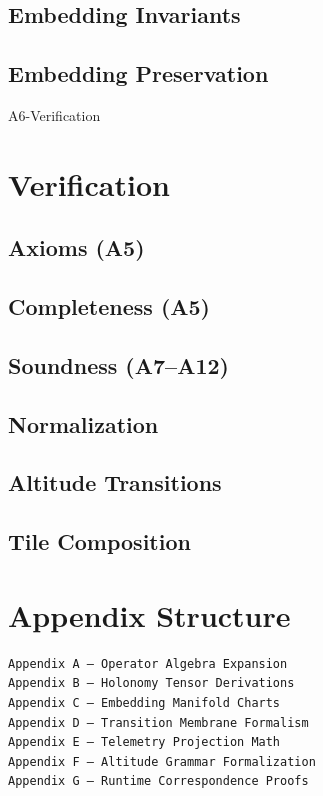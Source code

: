 \documentclass[11pt]{article}
\begin{document}
\subsection{Embedding Invariants}
\subsection{Embedding Preservation}

\newpage


\begin{citationmembrane}{A6-Verification}
\end{citationmembrane}

\section{Verification}

\subsection{Axioms (A5)}
\subsection{Completeness (A5)}
\subsection{Soundness (A7--A12)}
\subsection{Normalization}
\subsection{Altitude Transitions}
\subsection{Tile Composition}

\newpage



\section{Appendix Structure}

\begin{verbatim}
Appendix A — Operator Algebra Expansion
Appendix B — Holonomy Tensor Derivations
Appendix C — Embedding Manifold Charts
Appendix D — Transition Membrane Formalism
Appendix E — Telemetry Projection Math
Appendix F — Altitude Grammar Formalization
Appendix G — Runtime Correspondence Proofs
\end{verbatim}
\end{document}
